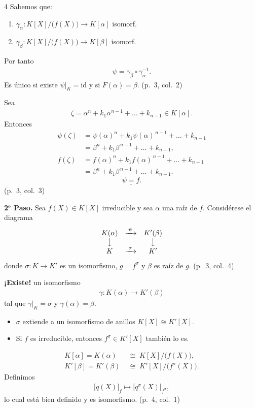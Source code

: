 \documentclass[landscape,a4paper]{article}
\begin{document}
\begin{multicols}{4}
Sabemos que:
\begin{enumerate}
\item $\gamma_{\alpha}:K[X]/\bigl(f(X)\bigr)\longrightarrow K[\alpha]$ isomorf.\\
\item $\gamma_{\beta}:K[X]/\bigl(f(X)\bigr)\longrightarrow K[\beta]$ isomorf.
\end{enumerate}
Por tanto 
\begin{align*}
\psi = \gamma_{\beta}\circ\gamma_{\alpha}^{-1}.
\end{align*}
Es único si existe $\psi|_{K}=\mathrm{id}$ y si $F(\alpha)=\beta$. (p.~3, col.~2)

Sea 
\begin{align*}
\zeta = \alpha^{n}+k_{1}\alpha^{n-1}+\dots+k_{n-1}\in K[\alpha].
\end{align*}
Entonces
\begin{align*}
\psi(\zeta)&=\psi(\alpha)^{n}+k_{1}\psi(\alpha)^{\,n-1}+\dots+k_{n-1}\\
           &=\beta^{n}+k_{1}\beta^{\,n-1}+\dots+k_{n-1},\\[4pt]
f(\zeta)   &=f(\alpha)^{n}+k_{1}f(\alpha)^{\,n-1}+\dots+k_{n-1}\\
           &=\beta^{n}+k_{1}\beta^{\,n-1}+\dots+k_{n-1}.
\end{align*}
\[
\underline{\psi = f}.
\]
(p.~3, col.~3)

\textbf{2$^{\mathrm{o}}$ Paso.} Sea $f(X)\in K[X]$ irreducible y sea $\alpha$ una raíz de $f$.  
Considérese el diagrama
\[
\begin{array}{ccc}
K(\alpha) & \xrightarrow{\;\psi\;} & K'(\beta)\\
\big\downarrow & & \big\downarrow \\
K & \xrightarrow{\;\sigma\;} & K'
\end{array}
\]
donde $\sigma:K\to K'$ es un isomorfismo,  
$g = f^{\sigma}$ y $\beta$ es raíz de $g$. (p.~3, col.~4)

\noindent\textbf{¡Existe!} un isomorfismo
\begin{align*}
\gamma:K(\alpha)\longrightarrow K'(\beta)
\end{align*}
tal que $\gamma|_{K} = \sigma$ y $\gamma(\alpha)=\beta$.
\smallskip
\begin{itemize}
\item $\sigma$ extiende a un isomorfismo de anillos $K[X]\cong K'[X]$.
\item Si $f$ es irreducible, entonces $f^{\sigma}\in K'[X]$ también lo es.
\end{itemize}
\begin{align*}
K[\alpha] = K(\alpha) &\;\cong\; K[X]\big/\!\bigl(f(X)\bigr),\\
K'[\beta] = K'(\beta) &\;\cong\; K'[X]\big/\!\bigl(f^{\sigma}(X)\bigr).
\end{align*}
Definimos
\begin{align*}
\bigl[q(X)\bigr]_{f}\longmapsto \bigl[q^{\sigma}(X)\bigr]_{f^{\sigma}},
\end{align*}
lo cual está bien definido y es isomorfismo. (p.~4, col.~1)


\end{multicols}
\end{document}
